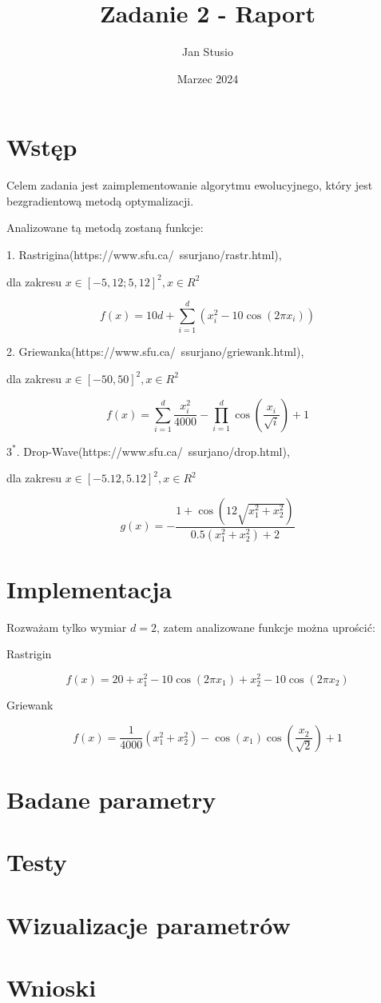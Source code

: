 \documentclass{article}
\title{Zadanie 2 - Raport}
\author{Jan Stusio}
\date{Marzec 2024}
\begin{document}
\maketitle

\section{Wstęp}

Celem zadania jest zaimplementowanie algorytmu ewolucyjnego, który jest bezgradientową metodą optymalizacji.


Analizowane tą metodą zostaną funkcje:

1. Rastrigina(https://www.sfu.ca/~ssurjano/rastr.html),

dla zakresu $x \in [-5,12;5,12]^2, x \in R^2$

$$
f(x) = 10d + \sum_{i=1}^{d} \left( x_i^2 - 10 \cos(2 \pi x_i) \right)
$$

2. Griewanka(https://www.sfu.ca/~ssurjano/griewank.html),

dla zakresu $x \in [-50, 50]^2, x \in R^2$

$$
f(x) =\sum_{i=1}^{d} \frac{x_i^2}{4000} - \prod_{i=1}^{d} \cos\left(\frac{x_i}{\sqrt{i}}\right) +1
$$

$3^*$. Drop-Wave(https://www.sfu.ca/~ssurjano/drop.html),

dla zakresu $x \in [-5.12, 5.12]^2, x \in R^2$

$$
g(x) = -\frac{1 + \cos\left(12 \sqrt{x_1^2 + x_2^2}\right)}{0.5(x_1^2 + x_2^2) + 2}
$$

\pagebreak

\section{Implementacja}


Rozważam tylko wymiar $d = 2$, zatem analizowane funkcje można uprościć:

Rastrigin

$$
f(x) = 20 + x_1^2 - 10 \cos(2 \pi x_1) + x_2^2 - 10 \cos(2 \pi x_2)
$$

Griewank

$$
f(x) =\frac{1}{4000} (x_1^2 + x_2^2) - \cos\left(x_1\right) \cos\left(\frac{x_2}{\sqrt{2}}\right) + 1
$$

\section{Badane parametry}

\section{Testy}

\section{Wizualizacje parametrów}

\section{Wnioski}
\end{document}
